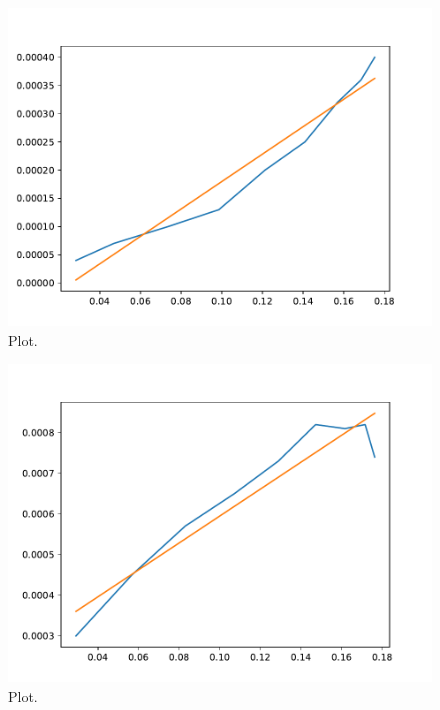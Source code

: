 



\begin{figure}
  \centering
  \includegraphics{../plots/Stange3a.pdf}
  \caption{Plot.}
  \label{fig:plot}
\end{figure}





\begin{figure}
  \centering
  \includegraphics{../plots/Stange3b.pdf}
  \caption{Plot.}
  \label{fig:plot}
\end{figure}
